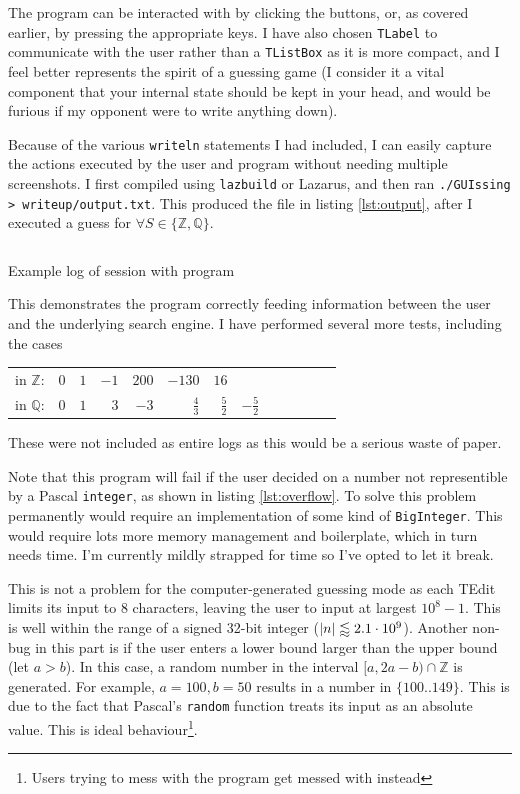 \documentclass[a4paper,11pt]{article}
\newenvironment{longlisting}
{\addvspace{\baselineskip}\captionsetup{type=listing}}
{\addvspace{\baselineskip}}
\begin{document}
    The program can be interacted with by clicking the buttons, or, as covered
    earlier, by pressing the appropriate keys. I have also chosen
    \texttt{TLabel} to communicate with the user rather than a \texttt{TListBox}
    as it is more compact, and I feel better represents the spirit of a guessing
    game (I consider it a vital component that your internal state should be
    kept in your head, and would be furious if my opponent were to write
    anything down).

    Because of the various \texttt{writeln} statements I had
    included, I can easily capture the actions executed by the user and program
    without needing multiple screenshots. I first compiled using
    \texttt{lazbuild} or Lazarus, and then ran
    \texttt{./GUIssing > writeup/output.txt}.
    This produced the file in listing \ref{lst:output}, after I executed a guess
    for $\forall S \in \{\mathbb{Z}, \mathbb{Q}\}$.

\begin{longlisting}
\inputminted{text}{output.txt}
\caption{Example log of session with program}\label{lst:output}
\end{longlisting}

    This demonstrates the program correctly feeding information between the user
    and the underlying search engine. I have performed several more tests,
    including the cases

    \begin{tabular}{rrrrrrrrrrrrr}
    in $\mathbb{Z}$: & $0$     & $1$     & $-1$    & $200$   & $-130$  & $16$ \\
    in $\mathbb{Q}$: & $0$ & $1$ & $3$ & $-3$ & $\frac{4}{3}$ & $\frac{5}{2}$ & $-\frac{5}{2}$ \\
    \end{tabular}

    These were not included as entire logs as this would be a
    serious waste of paper.

    Note that this program will fail if the user decided on a number not
    representible by a Pascal \texttt{integer}, as shown in listing
    \ref{lst:overflow}. To solve this problem permanently would require an
    implementation of some kind of \texttt{BigInteger}. This would require lots
    more memory management and boilerplate, which in turn needs time. I'm
    currently mildly strapped for time so I've opted to let it break.

    This is not a problem for the computer-generated guessing mode as each TEdit
    limits its input to 8 characters, leaving the user to input at largest
    $10^8-1$. This is well within the range of a signed 32-bit integer
    (\,$\abs{n} \lessapprox 2.1 \cdot 10^9$). Another non-bug in this part is if
    the user enters a lower bound larger than the upper bound (let $a > b$). In
    this case, a random number in the interval $[a, 2a - b) \cap \mathbb{Z}$ is
    generated. For example, $a = 100, b = 50$ results in a number in
    $\{100..149\}$. This is due to the fact that Pascal's \texttt{random} function
    treats its input as an absolute value. This is ideal
    behaviour\footnote{Users trying to mess with the program get messed with
    instead}.
\end{document}
